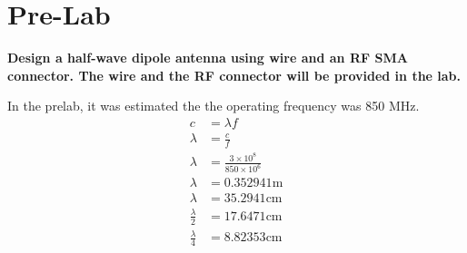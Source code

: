 \documentclass[journal]{IEEEtran}
\begin{document}
\section{Pre-Lab}
\textbf{Design a half-wave dipole antenna using wire and an RF SMA connector.
    The wire and the RF connector will be provided in the lab.}

In the prelab, it was estimated the the operating frequency was 850 MHz.
\begin{align*}
    c                  & =\lambda f                               \\
    \lambda            & =\frac{c}{f}                             \\
    \lambda            & =\frac{3\times 10^{8}}{850\times 10^{6}} \\
    \lambda            & =0.352941\text{m}                        \\
    \lambda            & =35.2941\text{cm}                        \\
    \frac{\lambda }{2} & =17.6471\text{cm}                        \\
    \frac{\lambda }{4} & =8.82353\text{cm}
\end{align*}

\end{document}
